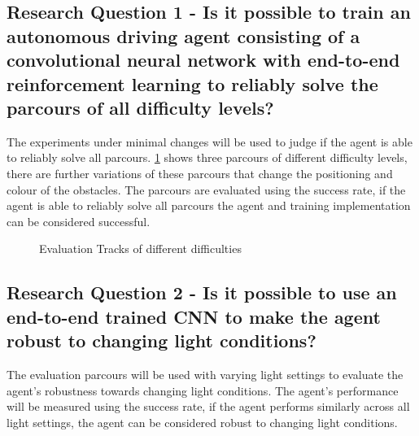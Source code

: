 \subsection{Research Question 1 - Is it possible to train an autonomous driving agent consisting of a convolutional neural network with end-to-end reinforcement learning to reliably solve the parcours of all difficulty levels?}

The experiments under minimal changes will be used to judge if the agent is able to reliably solve all parcours. \ref{fig:3tracks} shows three parcours of different difficulty levels, there are further variations of these parcours that change the positioning and colour of the obstacles. The parcours are evaluated using the success rate, if the agent is able to reliably solve all parcours the agent and training implementation can be considered successful.

\begin{figure}
    \centering
    \qquad
    \qquad
    \qquad
    \caption{Evaluation Tracks of different difficulties}
    \label{fig:3tracks}
\end{figure}

\subsection{Research Question 2 - Is it possible to use an end-to-end trained CNN to make the agent robust to changing light conditions?}

The evaluation parcours will be used with varying light settings to evaluate the agent's robustness towards changing light conditions. The agent's performance will be measured using the success rate, if the agent performs similarly across all light settings, the agent can be considered robust to changing light conditions.


